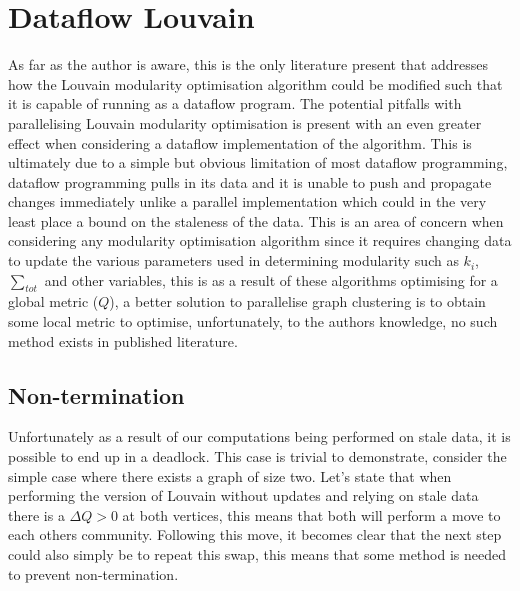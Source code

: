 \section{Dataflow Louvain}
As far as the author is aware, this is the only literature present that addresses how the Louvain modularity optimisation algorithm could be modified such that it is capable of running as a dataflow program. The potential pitfalls with parallelising Louvain modularity optimisation is present with an even greater effect when considering a dataflow implementation of the algorithm. This is ultimately due to a simple but obvious limitation of most dataflow programming, dataflow programming pulls in its data and it is unable to push and propagate changes immediately unlike a parallel implementation which could in the very least place a bound on the staleness of the data. This is an area of concern when considering any modularity optimisation algorithm since it requires changing data to update the various parameters used in determining modularity such as $k_i$, $\sum_{tot}$ and other variables, this is as a result of these algorithms optimising for a global metric ($Q$), a better solution to parallelise graph clustering is to obtain some local metric to optimise, unfortunately, to the authors knowledge, no such method exists in published literature. 

\subsection{Non-termination}
Unfortunately as a result of our computations being performed on stale data, it is possible to end up in a deadlock. This case is trivial to demonstrate, consider the simple case where there exists a graph of size two. Let's state that when performing the version of Louvain without updates and relying on stale data there is a $\Delta{Q} > 0$ at both vertices, this means that both will perform a move to each others community. Following this move, it becomes clear that the next step could also simply be to repeat this swap, this means that some method is needed to prevent non-termination. 

